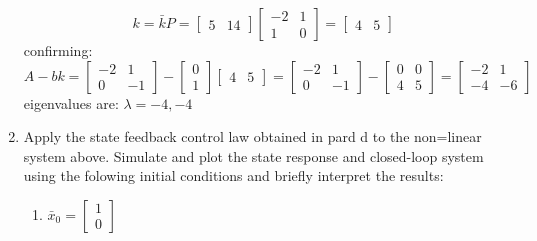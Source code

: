 \begin{enumerate}
\begin{equation}
    \end{equation}
    \begin{equation}
      k = \bar k P =
      \begin{bmatrix}5 & 14\end{bmatrix}
      \begin{bmatrix}
        -2 & 1 \\
        1 & 0
      \end{bmatrix} = 
      \begin{bmatrix}4 & 5\end{bmatrix}
    \end{equation}
    confirming:
    \begin{equation}
      A - bk =
      \begin{bmatrix}
        -2 & 1 \\
        0 & -1
      \end{bmatrix} - 
      \begin{bmatrix}
        0 \\
        1
      \end{bmatrix}
      \begin{bmatrix}4 & 5\end{bmatrix} =
      \begin{bmatrix}
        -2 & 1 \\
        0 & -1
      \end{bmatrix} - 
      \begin{bmatrix}
        0 & 0 \\
        4 & 5
      \end{bmatrix} = 
      \begin{bmatrix}
        -2 & 1 \\
        -4 & -6
      \end{bmatrix}
    \end{equation}
    eigenvalues are: $\lambda = -4, -4$
  \item Apply the state feedback control law obtained in pard d to the non=linear system above.
    Simulate and plot the state response and closed-loop system using the folowing initial conditions and
    briefly interpret the results:
    \begin{enumerate}
    \item $\bar x_0 = \begin{bmatrix} 1 \\ 0\end{bmatrix}$ \\
      \begin{figure}[H]
  \begin{center}

\end{center}
\end{figure}
\end{enumerate}
\end{enumerate}
